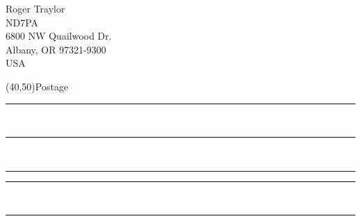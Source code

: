 \documentclass{article}
\begin{document}
\begin{minipage}[b]{0.25\textwidth}

\begin{multicols}{2}
    Roger Traylor\\
    ND7PA\\
    6800 NW Quailwood Dr.\\
    Albany, OR 97321-9300\\
    USA\\
    \columnbreak\par
    \hfill\framebox(40,50){\scriptsize Postage}\par
    \vspace{0.25\textheight}
    \rule{5.8cm}{0.01cm}\vspace*{1cm}\\ %
    \rule{5.8cm}{0.01cm}\vspace*{1cm}\\ %
    \rule{2.2cm}{0.01cm}\hspace*{0.2cm}\rule{3.4cm}{0.01cm}\vspace*{1cm}\\ %
    \rule{5.8cm}{0.01cm}\\ %
\end{multicols} 

\end{minipage}
\end{document}
